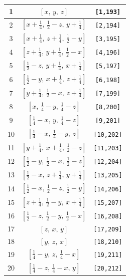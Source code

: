 \documentclass[fleqn,8pt]{jsarticle}
\begin{document}
\begin{longtable}{ccc}
1 & $\left[ x,\, y,\, z \right]$ & {\tt [1,193]} \\ \hline
2 & $\left[ x + \frac{1}{4},\, \frac{1}{2} - z,\, y + \frac{1}{4} \right]$ & {\tt [2,194]} \\ \hline
3 & $\left[ x + \frac{1}{4},\, z + \frac{1}{4},\, \frac{1}{2} - y \right]$ & {\tt [3,195]} \\ \hline
4 & $\left[ z + \frac{1}{4},\, y + \frac{1}{4},\, \frac{1}{2} - x \right]$ & {\tt [4,196]} \\ \hline
5 & $\left[ \frac{1}{2} - z,\, y + \frac{1}{4},\, x + \frac{1}{4} \right]$ & {\tt [5,197]} \\ \hline
6 & $\left[ \frac{1}{2} - y,\, x + \frac{1}{4},\, z + \frac{1}{4} \right]$ & {\tt [6,198]} \\ \hline
7 & $\left[ y + \frac{1}{4},\, \frac{1}{2} - x,\, z + \frac{1}{4} \right]$ & {\tt [7,199]} \\ \hline
8 & $\left[ x,\, \frac{1}{4} - y,\, \frac{1}{4} - z \right]$ & {\tt [8,200]} \\ \hline
9 & $\left[ \frac{1}{4} - x,\, y,\, \frac{1}{4} - z \right]$ & {\tt [9,201]} \\ \hline
10 & $\left[ \frac{1}{4} - x,\, \frac{1}{4} - y,\, z \right]$ & {\tt [10,202]} \\ \hline
11 & $\left[ y + \frac{1}{4},\, x + \frac{1}{4},\, \frac{1}{2} - z \right]$ & {\tt [11,203]} \\ \hline
12 & $\left[ \frac{1}{2} - y,\, \frac{1}{2} - x,\, \frac{1}{2} - z \right]$ & {\tt [12,204]} \\ \hline
13 & $\left[ \frac{1}{2} - x,\, z + \frac{1}{4},\, y + \frac{1}{4} \right]$ & {\tt [13,205]} \\ \hline
14 & $\left[ \frac{1}{2} - x,\, \frac{1}{2} - z,\, \frac{1}{2} - y \right]$ & {\tt [14,206]} \\ \hline
15 & $\left[ z + \frac{1}{4},\, \frac{1}{2} - y,\, x + \frac{1}{4} \right]$ & {\tt [15,207]} \\ \hline
16 & $\left[ \frac{1}{2} - z,\, \frac{1}{2} - y,\, \frac{1}{2} - x \right]$ & {\tt [16,208]} \\ \hline
17 & $\left[ z,\, x,\, y \right]$ & {\tt [17,209]} \\ \hline
18 & $\left[ y,\, z,\, x \right]$ & {\tt [18,210]} \\ \hline
19 & $\left[ \frac{1}{4} - y,\, z,\, \frac{1}{4} - x \right]$ & {\tt [19,211]} \\ \hline
20 & $\left[ \frac{1}{4} - z,\, \frac{1}{4} - x,\, y \right]$ & {\tt [20,212]} \\ \hline

\end{longtable}
\end{document}
